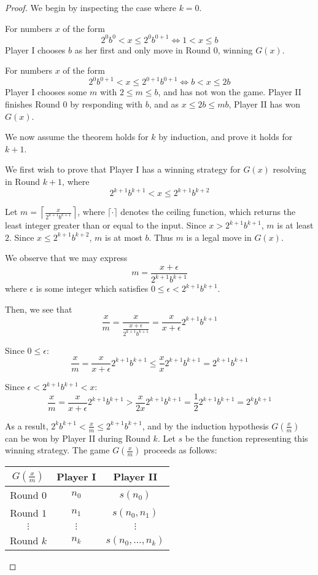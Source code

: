 \documentclass[11pt]{article}
\theoremstyle{plain}
\theoremstyle{definition}
\theoremstyle{remark}
\newcommand{\<}{\langle}
\renewcommand{\>}{\rangle}
\begin{document}
\begin{proof}
We begin by inspecting the case where $k=0$. 

For numbers $x$ of the form
  \[
    2^0b^0 < x  \leq 2^0b^{0+1} \Leftrightarrow 1 < x \leq b
  \]
Player I chooses $b$ as her first and only move in Round $0$, winning $G(x)$.

For numbers $x$ of the form
  \[
    2^0b^{0+1} < x  \leq 2^{0+1}b^{0+1} \Leftrightarrow b < x \leq 2b
  \]
Player I chooses some $m$ with $2 \leq m \leq b$, and has not won the game. Player II finishes Round $0$ by
  responding with $b$, and as $x \leq 2b \leq mb$, Player II has won $G(x)$.

We now assume the theorem holds for $k$ by induction, and prove it holds for $k+1$.

We first wish to prove that Player I has a winning strategy for $G(x)$ resolving in Round $k+1$, where
  \[
    2^{k+1}b^{k+1} < x  \leq 2^{k+1}b^{k+2}
  \]

Let $m = \left\lceil\frac{x}{2^{k+1}b^{k+1}}\right\rceil$, where $\lceil \cdot \rceil$ denotes the ceiling function, which returns the least integer greater than or equal to the input. Since $x > 2^{k+1}b^{k+1}$, $m$ is at least $2$. Since $x \leq 2^{k+1}b^{k+2}$, $m$ is at most $b$. Thus $m$ is a legal move in $G(x)$.

We observe that we may express
  \[
    m = \frac{x+\epsilon}{2^{k+1}b^{k+1}}
  \]
where $\epsilon$ is some integer which satisfies $0 \leq \epsilon < 2^{k+1}b^{k+1}$.

Then, we see that
  \[
    \frac{x}{m} = 
    \frac{x}{\frac{x+\epsilon}{2^{k+1}b^{k+1}}} =
    \frac{x}{x+\epsilon}2^{k+1}b^{k+1}
  \]

Since $0 \leq \epsilon$:
  \[
    \frac{x}{m} =
    \frac{x}{x+\epsilon}2^{k+1}b^{k+1} \leq
    \frac{x}{x}2^{k+1}b^{k+1} =
    2^{k+1}b^{k+1}
  \]

Since $\epsilon < 2^{k+1}b^{k+1} < x$:
  \[
    \frac{x}{m} =
    \frac{x}{x+\epsilon}2^{k+1}b^{k+1} >
    \frac{x}{2x}2^{k+1}b^{k+1} =
    \frac{1}{2}2^{k+1}b^{k+1} =
    2^kb^{k+1}
  \]

As a result, $2^kb^{k+1} < \frac{x}{m} \leq 2^{k+1}b^{k+1}$, and by the induction hypothesis $G(\frac{x}{m})$ can be won by Player II during Round $k$. Let $s$ be the function representing this winning strategy. The game $G(\frac{x}{m})$ proceeds as follows:

\begin{center}\begin{tabular}{c|c|c}
$G(\frac{x}{m})$ & Player I & Player II \\\hline
Round $0$ & $n_0$ & $s(n_0)$ \\\hline
Round $1$ & $n_1$ & $s(n_0, n_1)$ \\\hline
$\vdots$ & $\vdots$ & $\vdots$ \\\hline
Round $k$ & $n_k$ & $s(n_0,\dots,n_k)$
\end{tabular}\end{center}


\end{proof}
\end{document}
